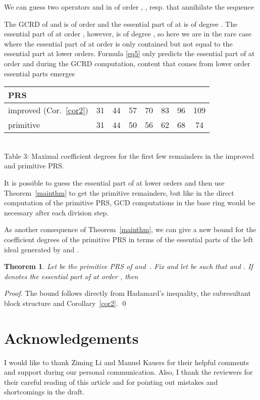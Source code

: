 \documentclass[3p,11pt,preprint]{elsarticle}
\newtheorem{theorem}{Theorem}
\begin{document}
\begin{example}
 We can guess two operators  and  in  of order , , resp. that annihilate the sequence

The GCRD of  and  is of order  and the essential part of  at  is of degree . The essential part of  at order , however, is of degree , so here we are in the rare case where the essential part of  at order  is only contained but not equal to the essential part at lower orders. Formula \eqref{eq5} only predicts the essential part of  at order   and during the GCRD computation, content that comes from lower order essential parts emerges
 \begin{center}
\begin{tabular}{l|c|c|c|c|c|c|c}
PRS &  &  &  &  &  &  & \\
\hline
 improved (Cor.~\ref{cor2})& 31 & 44 & 57 & 70 & 83 & 96 & 109 \rlap{\quad}\\
\hline 
 primitive & 31 & 44 & 50 & 56 & 62 & 68 & 74\\
\end{tabular}\\
{\vspace{0.1cm}\scriptsize{Table 3: Maximal coefficient degrees for the first few remainders in the improved and primitive PRS.}}
\end{center}
It is possible to guess the essential part of  at lower orders and then use Theorem~\ref{mainthm} to get the primitive remainders, but like in the direct computation of the primitive PRS, GCD computations in the base ring would be necessary after each division step.
\end{example}


 As another consequence of Theorem~\ref{mainthm}, we can give a new bound for the coefficient degrees of the primitive PRS in terms of the essential parts of the left ideal generated by  and . 
 \begin{theorem}
  Let  be the primitive PRS of  and~. Fix  and let  be such that  and . If  denotes the essential part of  at order , then
  
 \end{theorem}
\begin{proof}
 The bound follows directly from Hadamard's inequality, the subresultant block structure and Corollary~\ref{cor2}. \qed
\end{proof}

\section*{Acknowledgements}
I would like to thank Ziming Li and Manuel Kauers for their helpful comments and support during our personal communication. Also, I thank the reviewers for their careful reading of this article and for pointing out mistakes and shortcomings in the draft.



\end{document}
